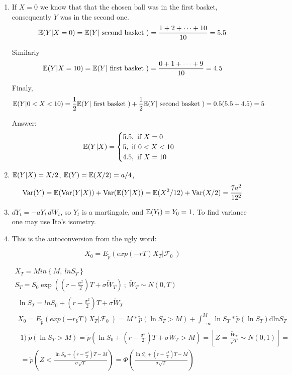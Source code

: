 \documentclass[12pt, a4paper]{article}
\begin{document}
\begin{enumerate}
\item If $X=0$ we know that that the chosen ball was in the first basket, consequently $Y$ was in the second one.
\[
\mathbb{E}(Y|X=0) = \mathbb{E}(Y| \text{ second basket } )=\frac{1+2+\dots+10}{10}=5.5
\]

Similarly
\[
\mathbb{E}(Y|X=10) = \mathbb{E}(Y|\text{ first basket } )=\frac{0+1+\dots+9}{10}=4.5
\]

Finaly,
\[
\mathbb{E}(Y|0<X<10) = \frac{1}{2}\mathbb{E}(Y|\text{ first basket }) +\frac{1}{2}\mathbb{E}(Y|\text{ second basket })=0.5(5.5+4.5)=5
\]

Answer:
\[
\mathbb{E}(Y|X) =
 \begin{cases}
   5.5, \text{ if } X=0\\
  5, \text{ if } 0<X<10\\
 4.5, \text{ if }  X=10\\
   \end{cases}
\]

\item $\mathbb{E}(Y|X)=X/2$, $\mathbb{E}(Y)=\mathbb{E}(X/2)=a/4$,
\[
\operatorname{Var}(Y)=\mathbb{E}(\operatorname{Var}(Y|X))+\operatorname{Var}(\mathbb{E}(Y|X))=\mathbb{E}(X^2/12)+\operatorname{Var}(X/2)=\frac{7a^2}{12^2}
\]
\item $dY_t=-a Y_t \, dW_t$, so $Y_t$ is a martingale, and $\mathbb{E}(Y_t)=Y_0=1$. To find variance one may use Ito's isometry.


\item This is the autoconversion from the ugly word:

\[X_{0} = E_{\tilde{p}}\left( exp\left( - rT \right)X_{T}\left| \mathcal{F}_{0} \right.\  \right)\]

\[\begin{matrix}
X_{T} = Min\left\{ M,\ lnS_{T} \right\} \\
S_{T} = S_{0}\exp\left( \left( r - \frac{\sigma^{2}}{2} \right)T + \sigma{\tilde{W}}_{T} \right)\ ;\ {\tilde{W}}_{T}\sim N\left( 0,T \right) \\
\begin{matrix}
\ln S_{T} = lnS_{0} + \left( r - \frac{\sigma^{2}}{2} \right)T + \sigma{\tilde{W}}_{T} \\
X_{0} = E_{\tilde{p}}\left( exp\left( - r_{\$}T \right)X_{T}\left| \mathcal{F}_{0} \right.\  \right) = M*\tilde{p}\left( \ln S_{T} > M \right) + \int_{- \infty}^{M}{\ln S_{T}*\tilde{p}\left( \ln S_{T} \right)\text{dln}S_{T}} \\
\begin{matrix}
1)\ \tilde{p}\left( \ln S_{T} > M \right) = \tilde{p}\left( \ln S_{0} + \left( r - \frac{\sigma^{2}}{2} \right)T + \sigma{\tilde{W}}_{T} > M \right) = \left\lbrack Z = \frac{{\tilde{W}}_{T}}{\sqrt{T}}\sim N(0,1) \right\rbrack = \\
 = \tilde{p}\left( Z < \frac{\ln S_{0} + \left( r - \frac{\sigma^{2}}{2} \right)T - M}{\sigma\sqrt{T}} \right) = \Phi\left( \frac{\ln S_{0} + \left( r - \frac{\sigma^{2}}{2} \right)T - M}{\sigma\sqrt{T}} \right) \\
\end{matrix} \\
\end{matrix} \\
\end{matrix}\]


\end{enumerate}
\end{document}
